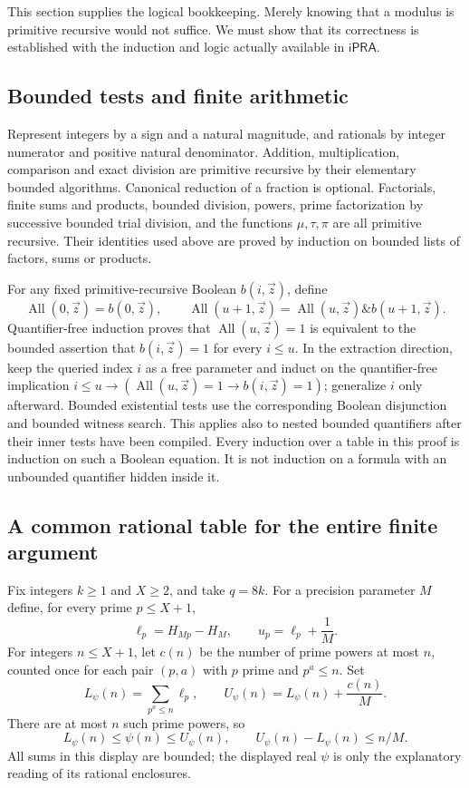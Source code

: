 \documentclass[11pt]{article}
\theoremstyle{definition}
\theoremstyle{remark}
\newcommand{\ipra}{\mathsf{iPRA}}
\begin{document}
This section supplies the logical bookkeeping. Merely knowing that a modulus
is primitive recursive would not suffice. We must show that its correctness
is established with the induction and logic actually available in $\ipra$.

\subsection{Bounded tests and finite arithmetic}

Represent integers by a sign and a natural magnitude, and rationals by
integer numerator and positive natural denominator. Addition, multiplication,
comparison and exact division are primitive recursive by their elementary
bounded algorithms. Canonical reduction of a fraction is optional. Factorials,
finite sums and products, bounded division, powers, prime factorization by
successive bounded trial division, and the functions $\mu,\tau,\pi$ are all
primitive recursive. Their identities used above are proved by induction on
bounded lists of factors, sums or products.

For any fixed primitive-recursive Boolean $b(i,\vec z)$, define
\[
 \operatorname{All}(0,\vec z)=b(0,\vec z),\qquad
 \operatorname{All}(u+1,\vec z)
 =\operatorname{All}(u,\vec z)\mathbin{\&}b(u+1,\vec z).
\]
Quantifier-free induction proves that $\operatorname{All}(u,\vec z)=1$
is equivalent to the bounded assertion that $b(i,\vec z)=1$ for every
$i\le u$. In the extraction direction, keep the queried index $i$ as a
free parameter and induct on the quantifier-free implication
$i\le u\to(\operatorname{All}(u,\vec z)=1\to b(i,\vec z)=1)$;
generalize $i$ only afterward. Bounded existential tests use the
corresponding Boolean disjunction and bounded witness search.
This applies also to nested bounded quantifiers after their inner tests have
been compiled. Every induction over a table in this proof is induction on
such a Boolean equation. It is not induction on a formula with an unbounded
quantifier hidden inside it.

\subsection{A common rational table for the entire finite argument}

Fix integers $k\ge1$ and $X\ge2$, and take $q=8k$.
For a precision parameter $M$ define, for every prime $p\le X+1$,
\[
 \ell_p=H_{Mp}-H_M,\qquad u_p=\ell_p+\frac1M.
\]
For integers $n\le X+1$, let $c(n)$ be the number of prime powers at most
$n$, counted once for each pair $(p,a)$ with $p$ prime and $p^a\le n$.
Set
\[
 L_\psi(n)=\sum_{p^a\le n}\ell_p,\qquad
 U_\psi(n)=L_\psi(n)+\frac{c(n)}M.
\]
There are at most $n$ such prime powers, so
\begin{equation}\label{eq:psi-table}
 L_\psi(n)\le\psi(n)\le U_\psi(n),\qquad
 U_\psi(n)-L_\psi(n)\le n/M.
\end{equation}
All sums in this display are bounded; the displayed real $\psi$ is only
the explanatory reading of its rational enclosures.
\end{document}
